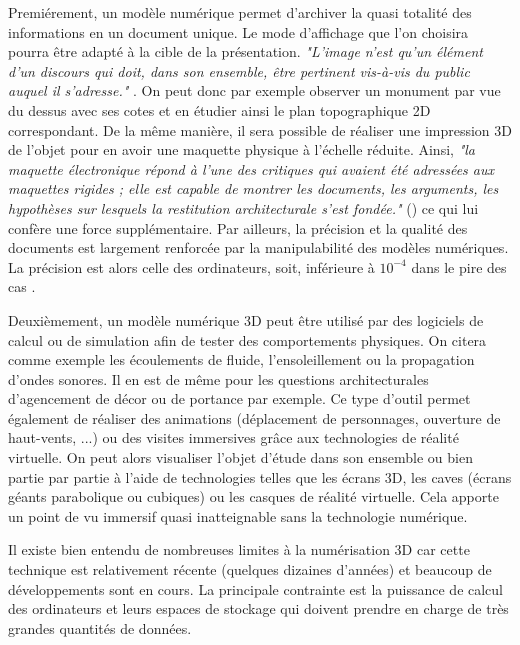 		Premiérement, un modèle numérique permet d'archiver la quasi totalité des informations en un document unique. Le mode d'affichage que l'on choisira pourra être adapté à la cible de la présentation. \textit{"L’image n’est qu’un élément d’un discours qui doit, dans son ensemble, être pertinent vis-à-vis du public auquel il s’adresse."} \cite{golvin}. On peut donc par exemple observer un monument par vue du dessus avec ses cotes et en étudier ainsi le plan topographique 2D correspondant. De la même manière, il sera possible de réaliser une impression 3D de l'objet pour en avoir une maquette physique à l'échelle réduite. Ainsi, \textit{"la maquette électronique répond à l’une des critiques qui avaient été adressées aux maquettes rigides ; elle est capable de montrer les documents, les arguments, les hypothèses sur lesquels la restitution architecturale s’est fondée."} (\cite{golvin}) ce qui lui confère une force supplémentaire. Par ailleurs, la précision et la qualité des documents est largement renforcée par la manipulabilité des modèles numériques. La précision est alors celle des ordinateurs, soit, inférieure à $10^{-4}$ dans le pire des cas \cite{precisionmachine}. 
		 
		 Deuxièmement, un modèle numérique 3D peut être utilisé par des logiciels de calcul ou de simulation afin de tester des comportements physiques. On citera comme exemple les écoulements de fluide, l'ensoleillement ou la propagation d'ondes sonores. Il en est de même pour les questions architecturales d'agencement de décor ou de portance par exemple. Ce type d'outil permet également de réaliser des animations (déplacement de personnages, ouverture de haut-vents, ...) ou des visites immersives grâce aux technologies de réalité virtuelle. On peut alors visualiser l'objet d'étude dans son ensemble ou bien partie par partie à l'aide de technologies telles que les écrans 3D, les caves (écrans géants parabolique ou cubiques) ou les casques de réalité virtuelle. Cela apporte un point de vu immersif quasi inatteignable sans la technologie numérique.
		 
Il existe bien entendu de nombreuses limites à la numérisation 3D car cette technique est relativement récente (quelques dizaines d'années) et beaucoup de développements sont en cours. La principale contrainte est la puissance de calcul des ordinateurs et leurs espaces de stockage qui doivent prendre en charge de très grandes quantités de données.

